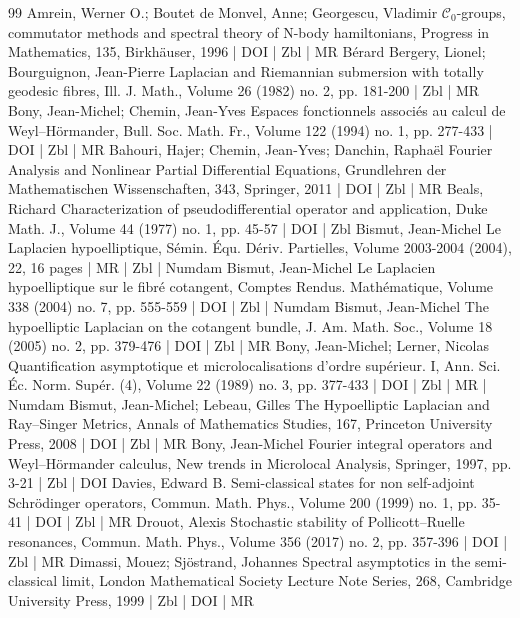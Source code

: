 \begin{thebibliography}{99}
 Amrein, Werner O.; Boutet de Monvel, Anne; Georgescu, Vladimir $\mathcal{C}_{0}$-groups, commutator methods and spectral theory of N-body hamiltonians, Progress in Mathematics, 135, Birkhäuser, 1996 | DOI | Zbl | MR
 Bérard Bergery, Lionel; Bourguignon, Jean-Pierre Laplacian and Riemannian submersion with totally geodesic fibres, Ill. J. Math., Volume 26 (1982) no. 2, pp. 181-200 | Zbl | MR
 Bony, Jean-Michel; Chemin, Jean-Yves Espaces fonctionnels associés au calcul de Weyl–Hörmander, Bull. Soc. Math. Fr., Volume 122 (1994) no. 1, pp. 277-433 | DOI | Zbl | MR
 Bahouri, Hajer; Chemin, Jean-Yves; Danchin, Raphaël Fourier Analysis and Nonlinear Partial Differential Equations, Grundlehren der Mathematischen Wissenschaften, 343, Springer, 2011 | DOI | Zbl | MR
 Beals, Richard Characterization of pseudodifferential operator and application, Duke Math. J., Volume 44 (1977) no. 1, pp. 45-57 | DOI | Zbl
 Bismut, Jean-Michel Le Laplacien hypoelliptique, Sémin. Équ. Dériv. Partielles, Volume 2003-2004 (2004), 22, 16 pages | MR | Zbl | Numdam
 Bismut, Jean-Michel Le Laplacien hypoelliptique sur le fibré cotangent, Comptes Rendus. Mathématique, Volume 338 (2004) no. 7, pp. 555-559 | DOI | Zbl | Numdam
 Bismut, Jean-Michel The hypoelliptic Laplacian on the cotangent bundle, J. Am. Math. Soc., Volume 18 (2005) no. 2, pp. 379-476 | DOI | Zbl | MR
 Bony, Jean-Michel; Lerner, Nicolas Quantification asymptotique et microlocalisations d’ordre supérieur. I, Ann. Sci. Éc. Norm. Supér. (4), Volume 22 (1989) no. 3, pp. 377-433 | DOI | Zbl | MR | Numdam
 Bismut, Jean-Michel; Lebeau, Gilles The Hypoelliptic Laplacian and Ray–Singer Metrics, Annals of Mathematics Studies, 167, Princeton University Press, 2008 | DOI | Zbl | MR
 Bony, Jean-Michel Fourier integral operators and Weyl–Hörmander calculus, New trends in Microlocal Analysis, Springer, 1997, pp. 3-21 | Zbl | DOI
 Davies, Edward B. Semi-classical states for non self-adjoint Schrödinger operators, Commun. Math. Phys., Volume 200 (1999) no. 1, pp. 35-41 | DOI | Zbl | MR
 Drouot, Alexis Stochastic stability of Pollicott–Ruelle resonances, Commun. Math. Phys., Volume 356 (2017) no. 2, pp. 357-396 | DOI | Zbl | MR
 Dimassi, Mouez; Sjöstrand, Johannes Spectral asymptotics in the semi-classical limit, London Mathematical Society Lecture Note Series, 268, Cambridge University Press, 1999 | Zbl | DOI | MR

\end{thebibliography}

